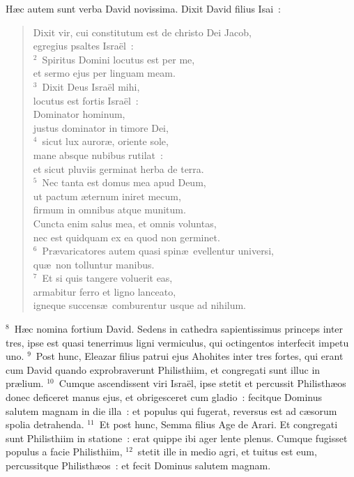 \lettrine[lines=3,image=true,loversize=0.05,lraise=-0.03]{H}{}\ae c autem sunt verba David novissima. Dixit David filius Isai~: \begin{flushleft}\begin{verse}\vspace{6pt}Dixit vir, cui constitutum est de christo Dei Jacob,\\ egregius psaltes Isra\"el~:\\
${}^{2}$~Spiritus Domini locutus est per me,\\ et sermo ejus per linguam meam.\\
${}^{3}$~Dixit Deus Isra\"el mihi,\\ locutus est fortis Isra\"el~:\\ Dominator hominum,\\ justus dominator in timore Dei,\\
${}^{4}$~sicut lux auror\ae , oriente sole,\\ mane absque nubibus rutilat~:\\ et sicut pluviis germinat herba de terra.\\
${}^{5}$~Nec tanta est domus mea apud Deum,\\ ut pactum \ae ternum iniret mecum,\\ firmum in omnibus atque munitum.\\ Cuncta enim salus mea, et omnis voluntas,\\ nec est quidquam ex ea quod non germinet.\\
${}^{6}$~Pr\ae varicatores autem quasi spin\ae\ evellentur universi,\\ qu\ae\ non tolluntur manibus.\\
${}^{7}$~Et si quis tangere voluerit eas,\\ armabitur ferro et ligno lanceato,\\ igneque succens\ae\ comburentur usque ad nihilum.\end{verse}\end{flushleft}


${}^{8}$~H\ae c nomina fortium David. Sedens in cathedra sapientissimus princeps inter tres, ipse est quasi tenerrimus ligni vermiculus, qui octingentos interfecit impetu uno.
${}^{9}$~Post hunc, Eleazar filius patrui ejus Ahohites inter tres fortes, qui erant cum David quando exprobraverunt Philisthiim, et congregati sunt illuc in pr\ae lium.
${}^{10}$~Cumque ascendissent viri Isra\"el, ipse stetit et percussit Philisth\ae os donec deficeret manus ejus, et obrigesceret cum gladio~: fecitque Dominus salutem magnam in die illa~: et populus qui fugerat, reversus est ad c\ae sorum spolia detrahenda.
${}^{11}$~Et post hunc, Semma filius Age de Arari. Et congregati sunt Philisthiim in statione~: erat quippe ibi ager lente plenus. Cumque fugisset populus a facie Philisthiim,
${}^{12}$~stetit ille in medio agri, et tuitus est eum, percussitque Philisth\ae os~: et fecit Dominus salutem magnam.


